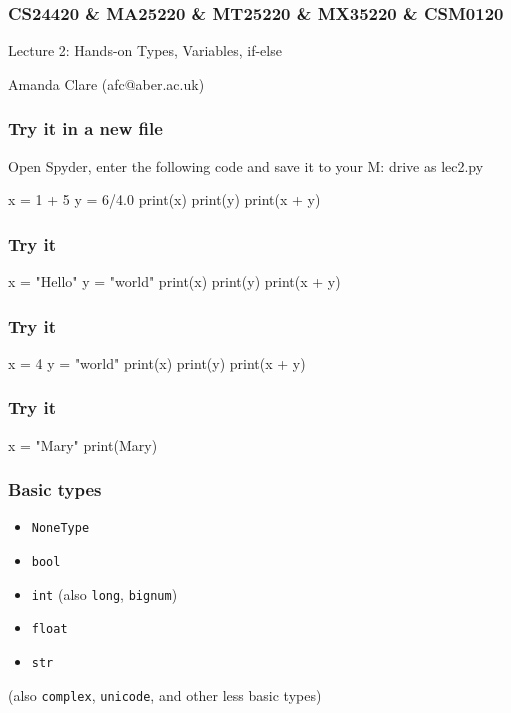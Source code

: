 \documentclass{beamer}
\begin{document}

\begin{frame}
\frametitle{CS24420 \& MA25220 \& MT25220 \& MX35220 \& CSM0120}

\begin{center}
\begin{huge}
Lecture 2: Hands-on Types, Variables, if-else
\end{huge}
\bigskip

Amanda Clare (afc@aber.ac.uk)

\end{center}
\end{frame}


\begin{frame}[fragile]
\frametitle{Try it in a new file}
Open Spyder, enter the following code and save it to your M: drive as lec2.py
\begin{code}
x = 1 + 5
y = 6/4.0
print(x)
print(y)
print(x + y)
\end{code}
\end{frame}

\begin{frame}[fragile]
\frametitle{Try it}
\begin{code}
x = "Hello"
y = "world"
print(x)
print(y)
print(x + y)
\end{code}
\end{frame}


\begin{frame}[fragile]
\frametitle{Try it}
\begin{code}
x = 4
y = "world"
print(x)
print(y)
print(x + y)
\end{code}
\end{frame}

\begin{frame}[fragile]
\frametitle{Try it}
\begin{code}
x = "Mary"
print(Mary)
\end{code}
\end{frame}



\begin{frame}
\frametitle{Basic types}
\begin{itemize}
\item {\tt NoneType}
\item {\tt bool}
\item {\tt int} (also {\tt long}, {\tt bignum})
\item {\tt float}
\item {\tt str} 
\end{itemize}
(also {\tt complex}, {\tt unicode}, and other less basic types)
\end{frame}
\end{document}
